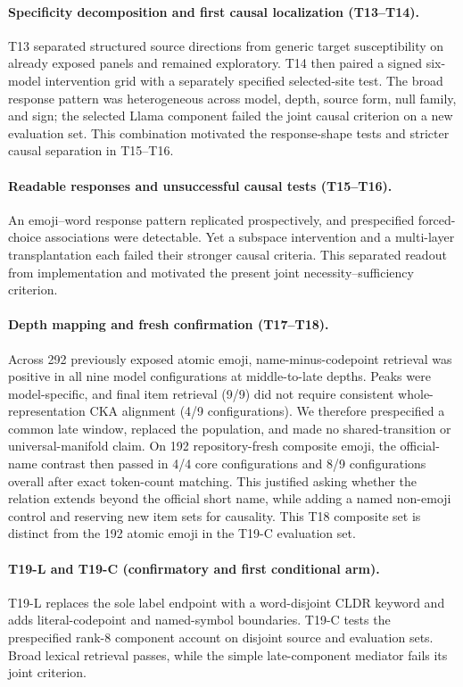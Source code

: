 \documentclass{article}
\begin{document}
\paragraph{Specificity decomposition and first causal localization (T13--T14).}
T13 separated structured source directions from generic target susceptibility
on already exposed panels and remained exploratory. T14 then paired a signed
six-model intervention grid with a separately specified selected-site test.
The broad response pattern was heterogeneous across model, depth, source form,
null family, and sign; the selected Llama component failed the joint causal
criterion on a new evaluation set. This combination motivated the
response-shape tests and stricter causal separation in T15--T16.

\paragraph{Readable responses and unsuccessful causal tests (T15--T16).}
An emoji--word response pattern replicated prospectively, and prespecified
forced-choice associations were detectable. Yet a subspace intervention and
a multi-layer transplantation each failed their stronger causal criteria. This
separated readout from implementation and motivated the present joint
necessity--sufficiency criterion.

\paragraph{Depth mapping and fresh confirmation (T17--T18).}
Across 292 previously exposed atomic emoji, name-minus-codepoint retrieval was
positive in all nine model configurations at middle-to-late depths. Peaks were
model-specific, and final item retrieval (9/9) did not require consistent
whole-representation CKA alignment (4/9 configurations). We therefore
prespecified a common late window, replaced the population, and made no shared-transition or
universal-manifold claim. On 192 repository-fresh composite emoji, the
official-name contrast then
passed in 4/4 core configurations and 8/9 configurations overall after exact token-count
matching. This justified asking whether the relation extends beyond the
official short name, while adding a named non-emoji control and reserving new
item sets for causality. This T18 composite set is distinct from the 192
atomic emoji in the T19-C evaluation set.

\paragraph{T19-L and T19-C (confirmatory and first conditional arm).}
T19-L replaces the sole label endpoint with a word-disjoint CLDR keyword and
adds literal-codepoint and named-symbol boundaries. T19-C tests the prespecified
rank-8 component account on disjoint source and evaluation sets. Broad
lexical retrieval passes, while the simple late-component mediator fails its
joint criterion.
\end{document}
